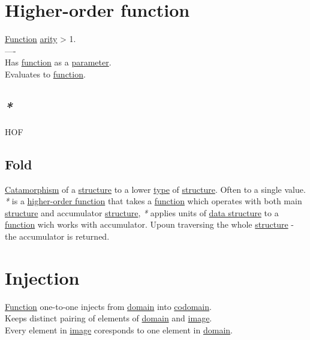\documentclass[a4paper,14pt,oneside]{book}
\begin{document}
\section{\label{org9ab10e9}Higher-order function}
\label{sec:org9966887}
\hyperref[orge00b05b]{Function} \hyperref[org7302783]{arity} > 1.\\

----\\

Has \hyperref[orge00b05b]{function} as a \hyperref[org63b5bc7]{parameter}.\\
Evaluates to \hyperref[orge00b05b]{function}.\\

\subsection{\emph{*}}
\label{sec:orgd44499b}

\label{org0752520}HOF\\

\subsection{\label{org5faacb2}Fold}
\label{sec:org9981b8a}
\hyperref[org7b22ee6]{Catamorphism} of a \hyperref[orgc6baf3c]{structure} to a lower \hyperref[orgc4a7610]{type} of \hyperref[orgc6baf3c]{structure}. Often to a single value.\\

\emph{*} is a \hyperref[org9ab10e9]{higher-order function} that takes a \hyperref[orge00b05b]{function} which operates with both main \hyperref[orgc6baf3c]{structure} and accumulator \hyperref[orgc6baf3c]{structure}, \emph{*} applies units of \hyperref[orga9162f5]{data structure} to a \hyperref[orge00b05b]{function} wich works with accumulator. Upoun traversing the whole \hyperref[orgc6baf3c]{structure} - the accumulator is returned.\\

\section{\label{orgd171b94}Injection}
\label{sec:org020118a}
\hyperref[orge00b05b]{Function} one-to-one injects from \hyperref[orge94fc58]{domain} into \hyperref[org2fb83bf]{codomain}.\\

Keeps distinct pairing of elements of \hyperref[orge94fc58]{domain} and \hyperref[org2ba15d0]{image}.\\
Every element in \hyperref[org2ba15d0]{image} coresponds to one element in \hyperref[orge94fc58]{domain}.\\
\end{document}
